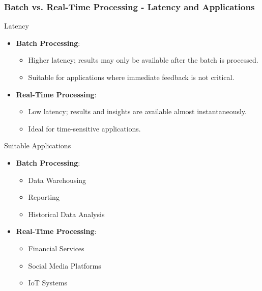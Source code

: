 \documentclass[aspectratio=169]{beamer}
\begin{document}
\begin{frame}[fragile]
    \frametitle{Batch vs. Real-Time Processing - Latency and Applications}
    \begin{block}{Latency}
        \begin{itemize}
            \item \textbf{Batch Processing}:
                \begin{itemize}
                    \item Higher latency; results may only be available after the batch is processed.
                    \item Suitable for applications where immediate feedback is not critical.
                \end{itemize}
            \item \textbf{Real-Time Processing}:
                \begin{itemize}
                    \item Low latency; results and insights are available almost instantaneously.
                    \item Ideal for time-sensitive applications.
                \end{itemize}
        \end{itemize}
    \end{block}
    
    \begin{block}{Suitable Applications}
        \begin{itemize}
            \item \textbf{Batch Processing}:
                \begin{itemize}
                    \item Data Warehousing
                    \item Reporting
                    \item Historical Data Analysis
                \end{itemize}
            \item \textbf{Real-Time Processing}:
                \begin{itemize}
                    \item Financial Services
                    \item Social Media Platforms
                    \item IoT Systems
                \end{itemize}
        \end{itemize}
    \end{block}
\end{frame}
\end{document}
